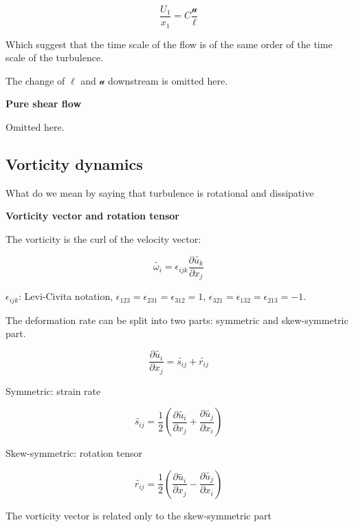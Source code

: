 \documentclass{article}
\begin{document}
\begin{equation*}
    \frac{U_1}{x_1}=C\frac{\mathcal{u}}{\ell}
\end{equation*}

Which suggest that the time scale of the flow is of the same order of the time scale of the turbulence.

The change of $\ell$ and $\mathcal{u}$ downstream is omitted here.

\textbf{Pure shear flow}

Omitted here.

\subsection{Vorticity dynamics}

What do we mean by saying that turbulence is rotational and dissipative

\textbf{Vorticity vector and rotation tensor}

The vorticity is the curl of the velocity vector:

\begin{equation*}
    \tilde{\omega_i}=\epsilon_{ijk}\frac{\partial \tilde{u_k}}{\partial x_j}
\end{equation*}

$\epsilon_{ijk}$: Levi-Civita notation, $\epsilon_{123}=\epsilon_{231}=\epsilon_{312}=1$, $\epsilon_{321}=\epsilon_{132}=\epsilon_{213}=-1$.

The deformation rate can be split into two parts: symmetric and skew-symmetric part.

\begin{equation*}
    \frac{\partial\tilde{u_i}}{\partial x_j}=\tilde{s_{ij}}+\tilde{r_{ij}}
\end{equation*}

Symmetric: strain rate

\begin{equation*}
    \tilde{s_{ij}}=\frac12\left(\frac{\partial \tilde{u_i}}{\partial x_j}+\frac{\partial \tilde{u_j}}{\partial x_i}\right)
\end{equation*}

Skew-symmetric: rotation tensor

\begin{equation*}
    \tilde{r_{ij}}=\frac12\left(\frac{\partial \tilde{u_i}}{\partial x_j}-\frac{\partial \tilde{u_j}}{\partial x_i}\right)
\end{equation*}

The vorticity vector is related only to the skew-symmetric part
\end{document}
